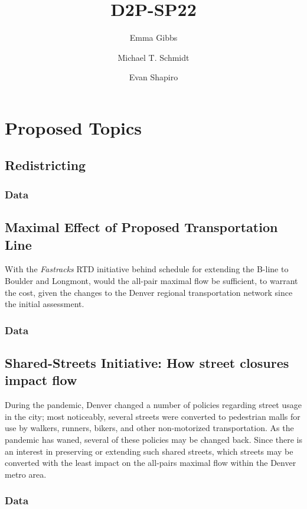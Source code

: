 \documentclass{amsart}
\begin{document}
\title{D2P-SP22}

\author{Emma Gibbs}

\author{Michael T. Schmidt}

\author{Evan Shapiro}

\maketitle

\section{Proposed Topics}

\subsection{Redistricting}
\subsubsection{Data}

\subsection{Maximal Effect of Proposed Transportation Line}
With the \emph{Fastracks} RTD initiative behind schedule for extending the B-line to Boulder and Longmont, would the all-pair maximal flow be sufficient, to warrant the cost, given the changes to the Denver regional transportation network since the initial assessment.

\subsubsection{Data}

\subsection{Shared-Streets Initiative: How street closures impact flow}
During the pandemic, Denver changed a number of policies regarding street usage in the city; most noticeably, several streets were converted to pedestrian malls for use by walkers, runners, bikers, and other non-motorized transportation.
As the pandemic has waned, several of these policies may be changed back.
Since there is an interest in preserving or extending such shared streets, which streets may be converted with the least impact on the all-pairs maximal flow within the Denver metro area.

\subsubsection{Data}


\nocite{*}

\printbibliography%
\end{document}

